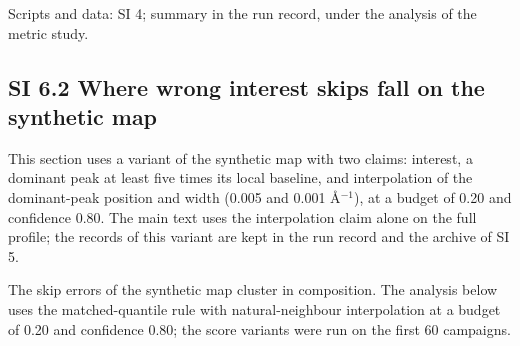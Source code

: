 \documentclass{iopjournal}
\begin{document}
Scripts and data: SI 4; summary in the run record, under the analysis of the metric study.

\hypertarget{si-6.2-where-wrong-interest-skips-fall-on-the-synthetic-map}{%
\subsection*{SI 6.2 Where wrong interest skips fall on the synthetic map}\label{si-6.2-where-wrong-interest-skips-fall-on-the-synthetic-map}}

This section uses a variant of the synthetic map with two claims: interest, a dominant peak at least five times its local baseline, and interpolation of the dominant-peak position and width (0.005 and 0.001 \AA{}\ensuremath{^{-1}}), at a budget of 0.20 and confidence 0.80. The main text uses the interpolation claim alone on the full profile; the records of this variant are kept in the run record and the archive of SI 5.

The skip errors of the synthetic map cluster in composition. The analysis below uses the matched-quantile rule with natural-neighbour interpolation at a budget of 0.20 and confidence 0.80; the score variants were run on the first 60 campaigns.
\end{document}
